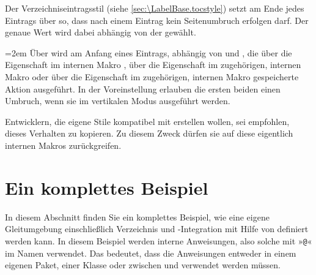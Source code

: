 \begin{Declaration}
\end{Declaration}
Der Verzeichniseintragsstil
 (siehe \autoref{sec:\LabelBase.tocstyle}) setzt am Ende jedes
Eintrags über   so, dass
nach einem Eintrag kein Seitenumbruch erfolgen darf. Der genaue Wert wird
dabei abhängig von der  gewählt.

\begingroup%
\emergencystretch=2em\relax%
Über  wird am Anfang eines
Eintrags, abhängig von  und , die über
die Eigenschaft  im internen Makro
, über die
Eigenschaft  im zugehörigen, internen Makro
 oder über die
Eigenschaft  im zugehörigen, internen Makro
 gespeicherte Aktion
ausgeführt. In der Voreinstellung erlauben die ersten
beiden einen Umbruch, wenn sie im vertikalen Modus ausgeführt werden.\par%
\endgroup

Entwicklern, die eigene Stile kompatibel mit  erstellen
wollen, sei empfohlen, dieses Verhalten zu kopieren. Zu diesem Zweck dürfen
sie auf diese eigentlich internen Makros zurückgreifen.%
\EndIndexGroup


\section{Ein komplettes Beispiel}

In diesem Abschnitt finden Sie ein komplettes Beispiel, wie eine eigene
Gleitumgebung einschließlich Verzeichnis und \KOMAScript-Integration mit Hilfe
von  definiert werden kann. In diesem Beispiel werden
interne Anweisungen, also solche mit »\texttt{@}« im Namen
verwendet. Das  bedeutet, dass die Anweisungen entweder in
einem eigenen Paket, einer Klasse oder zwischen
%
 und 
verwendet werden müssen.

